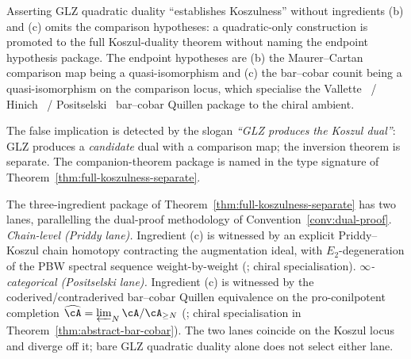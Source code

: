 \begin{remark}
\label{rem:glz-three-ingredients}
Asserting GLZ quadratic duality ``establishes Koszulness'' without
ingredients (b) and (c) omits the comparison hypotheses: a
quadratic-only construction is promoted to the full Koszul-duality
theorem without naming the endpoint hypothesis package. The endpoint
hypotheses are (b) the Maurer--Cartan comparison map being a
quasi-isomorphism and (c) the bar--cobar counit being a
quasi-isomorphism on the comparison locus, which specialise the
Vallette~\cite{Val16} / Hinich~\cite{Hinich2003} /
Positselski~\cite{Positselski11,Positselski2018} bar--cobar Quillen
package to the chiral ambient.

The false implication is detected by the slogan \emph{``GLZ produces
the Koszul dual''}: GLZ produces a \emph{candidate}
dual with a comparison map; the inversion theorem is separate. The
companion-theorem package is named in the type signature of
Theorem~\ref{thm:full-koszulness-separate}.
\end{remark}

\begin{remark}
\label{rem:glz-two-lanes}
The three-ingredient package of
Theorem~\ref{thm:full-koszulness-separate} has two lanes,
parallelling the dual-proof methodology of
Convention~\ref{conv:dual-proof}.
\emph{Chain-level (Priddy lane).} Ingredient (c) is witnessed by an
explicit Priddy--Koszul chain homotopy contracting the augmentation
ideal, with $E_2$-degeneration of the PBW spectral sequence
weight-by-weight (\cite[\S7.4]{LV12}; chiral specialisation).
\emph{$\infty$-categorical (Positselski lane).} Ingredient (c) is
witnessed by the coderived/contraderived bar--cobar Quillen
equivalence on the pro-conilpotent completion
$\widehat{\cA} = \varprojlim_N \cA/\cA_{\geq N}$
(\cite{Positselski2011}; chiral specialisation in
Theorem~\ref{thm:abstract-bar-cobar}).
The two lanes coincide on the Koszul locus and diverge off it; bare
GLZ quadratic duality alone does not select either lane.
\end{remark}
